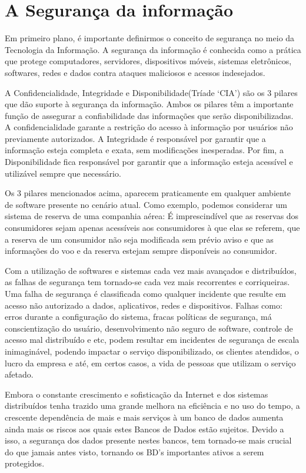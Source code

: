 \vspace{1.0cm}
\begingroup
\let\clearpage\relax
\chapter{A Segurança da informação}
\endgroup

Em primeiro plano, é importante definirmos o conceito de segurança no meio da Tecnologia da Informação. A segurança da informação é conhecida como a prática que protege computadores, servidores, dispositivos móveis, sistemas eletrônicos, softwares, redes e dados contra ataques maliciosos e acessos indesejados.

A Confidencialidade, Integridade e Disponibilidade(Tríade ‘CIA’) são os 3 pilares que dão suporte à segurança da informação. Ambos os pilares têm a importante função de assegurar a confiabilidade das informações que serão disponibilizadas. A confidencialidade garante a restrição do acesso à informação por usuários não previamente autorizados. A Integridade é responsável por garantir que a informação esteja completa e exata, sem modificações inesperadas. Por fim, a Disponibilidade fica responsável por garantir que a informação esteja acessível e utilizável sempre que necessário.

Os 3 pilares mencionados acima, aparecem praticamente em qualquer ambiente de software presente no cenário atual. Como exemplo, podemos considerar um sistema de reserva de uma companhia aérea: É imprescindível que as reservas dos consumidores sejam apenas acessíveis aos consumidores à que elas se referem, que a reserva de um consumidor não seja modificada sem prévio aviso e que as informações do voo e da reserva estejam sempre disponíveis ao consumidor.

Com a utilização de softwares e sistemas cada vez mais avançados e distribuídos, as falhas de segurança tem tornado-se cada vez mais recorrentes e corriqueiras. Uma falha de segurança é classificada como qualquer incidente que resulte em acesso não autorizado a dados, aplicativos, redes e dispositivos. Falhas como: erros durante a configuração do sistema, fracas políticas de segurança, má conscientização do usuário, desenvolvimento não seguro de software, controle de acesso mal distribuído e etc, podem resultar em incidentes de segurança de escala inimaginável, podendo impactar o serviço disponibilizado, os clientes atendidos, o lucro da empresa e até, em certos casos, a vida de pessoas que utilizam o serviço afetado.

Embora o constante crescimento e sofisticação da Internet e dos sistemas distribuídos tenha trazido uma grande melhora na eficiência e no uso do tempo, a crescente dependência de mais e mais serviços à um banco de dados aumenta ainda mais os riscos aos quais estes Bancos de Dados estão sujeitos. Devido a isso, a segurança dos dados presente nestes bancos, tem tornado-se mais crucial do que jamais antes visto, tornando os BD's importantes ativos a serem protegidos.

